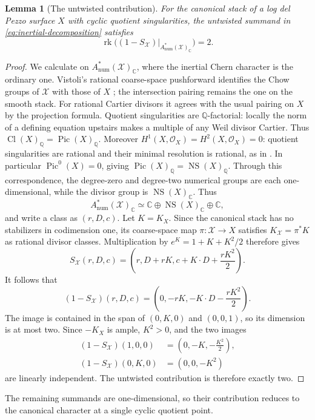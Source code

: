 \documentclass[11pt]{article}
\theoremstyle{plain}
\newtheorem{lemma}[theorem]{Lemma}
\theoremstyle{definition}
\theoremstyle{remark}
\newcommand{\cX}{\mathcal X}
\newcommand{\NS}{\operatorname{NS}}
\newcommand{\rk}{\operatorname{rk}}
\newcommand{\C}{\mathbb C}
\newcommand{\Q}{\mathbb Q}
\newcommand{\1}{\mathbf 1}
\begin{document}
\begin{lemma}[The untwisted contribution]\label{lem:untwisted-rank}
For the canonical stack of a log del Pezzo surface $X$ with cyclic quotient singularities, the untwisted summand in \eqref{eq:inertial-decomposition} satisfies
\[
\rk\bigl((1-S_{\cX})|_{A^*_{\mathrm{num}}(\cX)_{\C}}\bigr)=2.
\]
\end{lemma}

\begin{proof}
We calculate on $A^*_{\mathrm{num}}(\cX)_{\C}$, where the inertial Chern character is the ordinary one.  Vistoli's rational coarse-space pushforward identifies the Chow groups of $\cX$ with those of $X$ \cite[Proposition 6.1]{Vistoli}; the intersection pairing remains the one on the smooth stack.  For rational Cartier divisors it agrees with the usual pairing on $X$ by the projection formula.  Quotient singularities are $\Q$-factorial: locally the norm of a defining equation upstairs makes a multiple of any Weil divisor Cartier.  Thus $\operatorname{Cl}(X)_{\Q}=\operatorname{Pic}(X)_{\Q}$.  Moreover $H^1(X,\mathcal O_X)=H^2(X,\mathcal O_X)=0$: quotient singularities are rational and their minimal resolution is rational, as in \cite[Remark 4.3]{GR}.  In particular $\operatorname{Pic}^0(X)=0$, giving $\operatorname{Pic}(X)_{\Q}=\NS(X)_{\Q}$.  Through this correspondence, the degree-zero and degree-two numerical groups are each one-dimensional, while the divisor group is $\NS(X)_{\C}$.  Thus
\[
A^*_{\mathrm{num}}(\cX)_{\C}\simeq\C\oplus\NS(X)_{\C}\oplus\C,
\]
and write a class as $(r,D,c)$.  Let $K=K_X$.  Since the canonical stack has no stabilizers in codimension one, its coarse-space map $\pi:\cX\to X$ satisfies $K_{\cX}=\pi^*K$ as rational divisor classes.  Multiplication by $e^K=1+K+K^2/2$ therefore gives
\[
S_{\cX}(r,D,c)
=\left(r,D+rK,c+K\cdot D+\frac{rK^2}{2}\right).
\]
It follows that
\[
(1-S_{\cX})(r,D,c)
=\left(0,-rK,-K\cdot D-\frac{rK^2}{2}\right).
\]
The image is contained in the span of $(0,K,0)$ and $(0,0,1)$, so its dimension is at most two.  Since $-K_X$ is ample, $K^2>0$, and the two images
\[
\begin{aligned}
(1-S_{\cX})(1,0,0)&=\left(0,-K,-\frac{K^2}{2}\right),\\
(1-S_{\cX})(0,K,0)&=(0,0,-K^2)
\end{aligned}
\]
are linearly independent.  The untwisted contribution is therefore exactly two.
\end{proof}

The remaining summands are one-dimensional, so their contribution reduces to the canonical character at a single cyclic quotient point.
\end{document}
